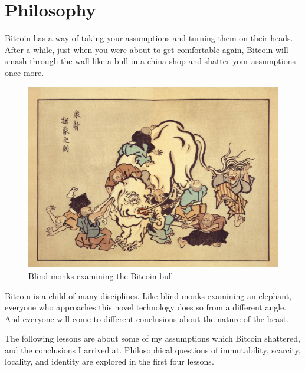 \part{Philosophy}
\label{ch:philosophy}

%

Bitcoin has a way of taking your assumptions and turning them on their heads.
After a while, just when you were about to get comfortable again, Bitcoin will
smash through the wall like a bull in a china shop and shatter your assumptions
once more.

\begin{figure}
  \includegraphics{assets/images/blind-monks.jpg}
  \caption{Blind monks examining the Bitcoin bull}
  \label{fig:blind-monks}
\end{figure}

Bitcoin is a child of many disciplines. Like blind monks examining an elephant,
everyone who approaches this novel technology does so from a different angle.
And everyone will come to different conclusions about the nature of the beast.

The following lessons are about some of my assumptions which Bitcoin shattered,
and the conclusions I arrived at. Philosophical questions of immutability,
scarcity, locality, and identity are explored in the first four lessons.

